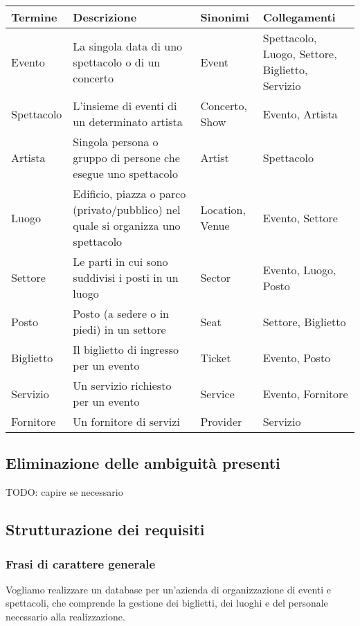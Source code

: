 \documentclass[a4paper,11pt]{article}
\begin{document}
\begin{tabularx}{\textwidth}{|X|>{\raggedright\arraybackslash}X|X|>{\raggedright\arraybackslash}X|}
\hline
\textbf{Termine} & \textbf{Descrizione} & \textbf{Sinonimi} & \textbf{Collegamenti}\\
\hline
Evento & La singola data di uno spettacolo o di un concerto & Event & Spettacolo, Luogo, Settore, Biglietto, Servizio\\
\hline
Spettacolo & L'insieme di eventi di un determinato artista & Concerto, Show & Evento, Artista\\
\hline
Artista & Singola persona o gruppo di persone che esegue uno spettacolo & Artist & Spettacolo\\
\hline
Luogo & Edificio, piazza o parco (privato/pubblico) nel quale si organizza uno spettacolo & Location, Venue & Evento, Settore\\
\hline
Settore & Le parti in cui sono suddivisi i posti in un luogo & Sector & Evento, Luogo, Posto\\
\hline
Posto & Posto (a sedere o in piedi) in un settore & Seat & Settore, Biglietto\\
\hline
Biglietto & Il biglietto di ingresso per un evento & Ticket & Evento, Posto\\
\hline
Servizio & Un servizio richiesto per un evento & Service & Evento, Fornitore\\
\hline
Fornitore & Un fornitore di servizi & Provider & Servizio\\
\hline
\end{tabularx}

\subsection{Eliminazione delle ambiguità presenti}
TODO: capire se necessario


\subsection{Strutturazione dei requisiti}

\subsubsection*{Frasi di carattere generale}

Vogliamo realizzare un database per un'azienda di organizzazione di eventi e spettacoli, che comprende la gestione dei biglietti, dei luoghi e del personale necessario alla realizzazione.
\end{document}
